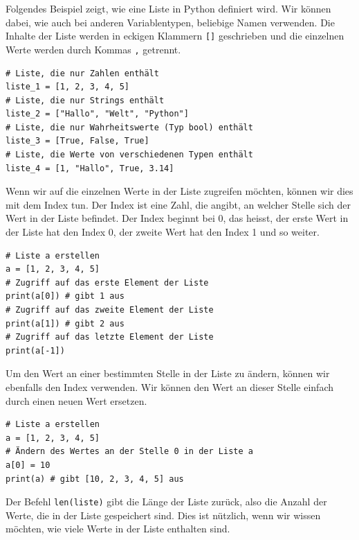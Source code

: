\begin{myexample}
Folgendes Beispiel zeigt, wie eine Liste in Python definiert wird. Wir können dabei, wie auch bei anderen Variablentypen, beliebige Namen verwenden. Die Inhalte der Liste werden in eckigen Klammern \lstinline|[]| geschrieben und die einzelnen Werte werden durch Kommas \lstinline|,| getrennt.
\begin{lstlisting}
# Liste, die nur Zahlen enthält 
liste_1 = [1, 2, 3, 4, 5]
# Liste, die nur Strings enthält
liste_2 = ["Hallo", "Welt", "Python"]
# Liste, die nur Wahrheitswerte (Typ bool) enthält
liste_3 = [True, False, True]
# Liste, die Werte von verschiedenen Typen enthält
liste_4 = [1, "Hallo", True, 3.14]
\end{lstlisting}
\end{myexample}
\begin{myexample}
Wenn wir auf die einzelnen Werte in der Liste zugreifen möchten, können wir dies mit dem Index tun. Der Index ist eine Zahl, die angibt, an welcher Stelle sich der Wert in der Liste befindet. Der Index beginnt bei 0, das heisst, der erste Wert in der Liste hat den Index 0, der zweite Wert hat den Index 1 und so weiter.
\begin{lstlisting}
# Liste a erstellen
a = [1, 2, 3, 4, 5]
# Zugriff auf das erste Element der Liste
print(a[0]) # gibt 1 aus
# Zugriff auf das zweite Element der Liste
print(a[1]) # gibt 2 aus
# Zugriff auf das letzte Element der Liste
print(a[-1])
\end{lstlisting}
\end{myexample}
\begin{myexample}
Um den Wert an einer bestimmten Stelle in der Liste zu ändern, können wir ebenfalls den Index verwenden. Wir können den Wert an dieser Stelle einfach durch einen neuen Wert ersetzen.
\begin{lstlisting}
# Liste a erstellen
a = [1, 2, 3, 4, 5]
# Ändern des Wertes an der Stelle 0 in der Liste a
a[0] = 10
print(a) # gibt [10, 2, 3, 4, 5] aus
\end{lstlisting}
\end{myexample}
\begin{myexample}
Der Befehl \lstinline|len(liste)| gibt die Länge der Liste zurück, also die Anzahl der Werte, die in der Liste gespeichert sind. Dies ist nützlich, wenn wir wissen möchten, wie viele Werte in der Liste enthalten sind.
\end{myexample}

